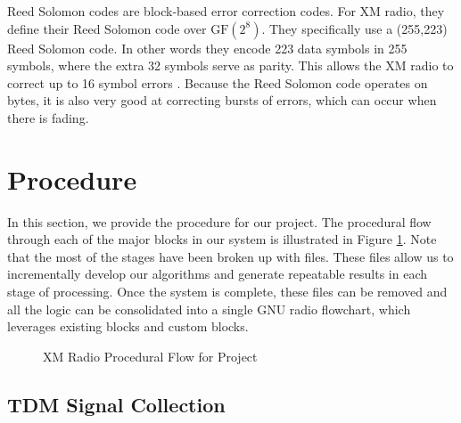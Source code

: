 \documentclass[conference,onecolumn]{IEEEtran}
\begin{document}
Reed Solomon codes are block-based error correction codes. For XM radio, they define their Reed Solomon code over $\text{GF}\left(2^8\right)$. They specifically use a (255,223) Reed Solomon code. In other words they encode 223 data symbols in 255 symbols, where the extra 32 symbols serve as parity. This allows the XM radio to correct up to 16 symbol errors \cite{a2008_us8260192b2}. Because the Reed Solomon code operates on bytes, it is also very good at correcting bursts of errors, which can occur when there is fading.

\section{Procedure}

In this section, we provide the procedure for our project. The procedural flow through each of the major blocks in our system is illustrated in Figure \ref{fig::xm_radio_processing}. Note that the most of the stages have been broken up with files. These files allow us to incrementally develop our algorithms and generate repeatable results in each stage of processing. Once the system is complete, these files can be removed and all the logic can be consolidated into a single GNU radio flowchart, which leverages existing blocks and custom blocks.

\begin{figure}[H]
	\centerline{}
	\caption{XM Radio Procedural Flow for Project}
	\label{fig::xm_radio_processing}
\end{figure}

\subsection{TDM Signal Collection}
\end{document}
